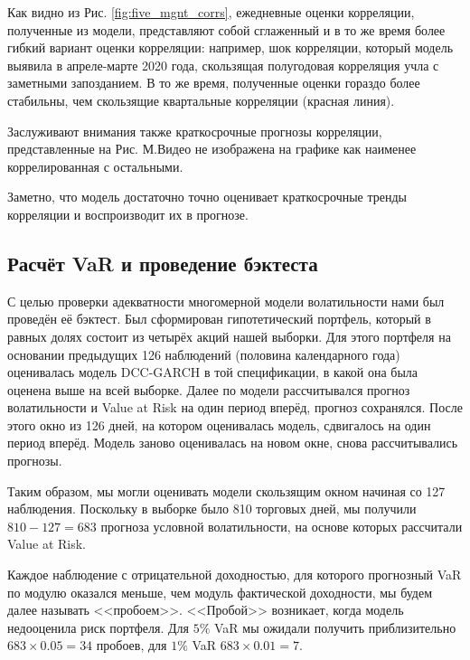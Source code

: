 \documentclass[a4paper,12pt,twoside]{article}
\begin{document}
Как видно из Рис. \ref{fig:five_mgnt_corrs}, ежедневные оценки корреляции, полученные из модели, представляют собой сглаженный и в то же время более гибкий вариант оценки корреляции: например, шок корреляции, который модель выявила в апреле-марте 2020 года, скользящая полугодовая корреляция учла с заметными запозданием. В то же время, полученные оценки гораздо более стабильны, чем скользящие квартальные корреляции (красная линия).

Заслуживают внимания также краткосрочные прогнозы корреляции, представленные на Рис. %
М.Видео не изображена на графике как наименее коррелированная с остальными.


Заметно, что модель достаточно точно оценивает краткосрочные тренды корреляции и воспроизводит их в прогнозе.

\subsection{Расчёт VaR и проведение бэктеста}\label{backtesting}
С целью проверки адекватности многомерной модели волатильности нами был проведён её бэктест.
Был сформирован гипотетический портфель, который в равных долях состоит из четырёх акций нашей выборки.
Для этого портфеля на основании предыдущих 126 наблюдений (половина календарного года) оценивалась модель DCC-GARCH в той спецификации, в какой она была оценена выше на всей выборке.
Далее по модели рассчитывался прогноз волатильности и Value at Risk на один период вперёд, прогноз сохранялся.
После этого окно из 126 дней, на котором оценивалась модель, сдвигалось на один период вперёд.
Модель заново оценивалась на новом окне, снова рассчитывались прогнозы.

Таким образом, мы могли оценивать модели скользящим окном начиная со 127 наблюдения.
Поскольку в выборке было 810 торговых дней, мы получили $810-127=683$ прогноза условной волатильности, на основе которых рассчитали Value at Risk.

Каждое наблюдение с отрицательной доходностью, для которого прогнозный VaR по модулю оказался меньше, чем модуль фактической доходности, мы будем далее называть <<пробоем>>.
<<Пробой>> возникает, когда модель недооценила риск портфеля.
Для $5\%$ VaR мы ожидали получить приблизительно $683\times0.05=34$ пробоев, для $1\%$ VaR $683\times0.01=7$.
\end{document}
